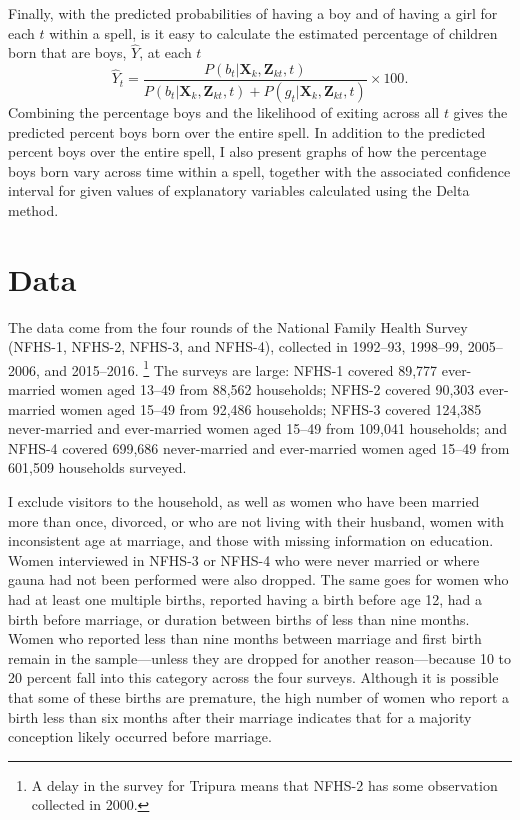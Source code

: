 \documentclass[12pt,letterpaper]{article}
\begin{document}
Finally, with the predicted probabilities of having a boy and of having 
a girl for each $t$ within a spell, is it easy to calculate the estimated 
percentage of children born that are boys, $\hat{Y}$, at each $t$  
\begin{equation}
\hat{Y}_t 
= 
\frac{ P(b_{t} | \mathbf{X}_{k}, \mathbf{Z}_{kt},t )}
{ P(b_{t} | \mathbf{X}_{k}, \mathbf{Z}_{kt},t) + P(g_{t} | \mathbf{X}_{k}, \mathbf{Z}_{kt},t )} 
\times 100.
\label{eq:probability_son}
\end{equation}
Combining the percentage boys and the likelihood of exiting across all $t$ 
gives the predicted percent boys born over the entire spell.
In addition to the predicted percent boys over the entire spell, 
I also present graphs of how the percentage boys born vary across time
within a spell, together with the associated confidence interval for given 
values of explanatory variables calculated using the Delta method.


\section{Data\label{sec:data}}

The data come from the four rounds of the National Family Health Survey 
(NFHS-1, NFHS-2, NFHS-3, and NFHS-4),
collected in 1992--93, 1998--99, 2005--2006, and 2015--2016.%
\footnote{
A delay in the survey for Tripura means that NFHS-2 has some observation 
collected in 2000.
}
The surveys are large: NFHS-1 covered 89,777 ever-married women 
aged 13--49 from 88,562 households;
NFHS-2 covered 90,303 ever-married women aged 15--49 from 92,486 households;
NFHS-3 covered 124,385 never-married and ever-married women aged 
15--49 from 109,041 households;
and 
NFHS-4 covered 699,686 never-married and ever-married women aged
15--49 from 601,509 households surveyed.

I exclude visitors to the household, as well as
women who have been married more than once, divorced, or who are 
not living with their husband,
women with inconsistent age at marriage,
and those with missing information on education.
Women interviewed in NFHS-3 or NFHS-4 who were never married or where gauna 
had not been performed were also dropped.
The same goes for women who had at least one multiple births,
reported having a birth before age 12, had a birth before marriage, or
duration between births of less than nine months.
Women who reported less than nine months between marriage and first birth
remain in the sample---unless they are dropped for another reason---because 
10 to 20 percent fall into this category across the four surveys.
Although it is possible that some of these births are premature, the high number of
women who report a birth less than six months after their marriage indicates that for
a majority conception likely occurred before marriage.
\end{document}
